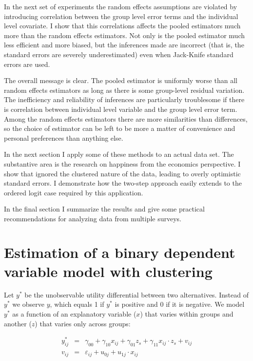 In the next set of experiments the random effects assumptions are violated by introducing correlation between the group level error terms and the individual level covariate. I show that this correlations affects the pooled estimators much more than the random effects estimators. Not only is the pooled estimator much less efficient and more biased, but the inferences made are incorrect (that is, the standard errors are severely underestimated) even when Jack-Knife standard errors are used.

The overall message is clear. The pooled estimator is uniformly worse than all random effects estimators as long as there is some group-level residual variation. The inefficiency and reliability of inferences are particularly troublesome if there is correlation between individual level variable and the group level error term.  Among the random effects estimators there are more similarities than differences, so the choice of estimator can be left to be more a matter of convenience and personal preferences than anything else.

In the next section I apply some of these methods to an actual data set. The substantive area is the research on happiness from the economics perspective.  I show that  \citet{Blanchflower:2004} ignored the clustered nature of the data, leading to overly optimistic standard errors. I  demonstrate how the two-step approach easily extends to the ordered logit case required by this application.

In the final section I summarize the results and give some practical recommendations for analyzing  data from multiple surveys.

\section{Estimation of a binary dependent variable model with clustering}

Let $y^*$ be the unobservable utility differential between two alternatives.  Instead of $y^*$ we  observe $y$, which equals 1 if $y^*$ is positive and 0 if it is negative. We model $y^*$ as a function of an explanatory variable ($x$) that varies within groups and another ($z$) that varies only across groups:

 \begin{eqnarray}
  y^*_{ij}&=&\gamma_{00}+\gamma_{10} x_{ij}+\gamma_{01} z_s+\gamma_{11} x_{ij}
\cdot z_s+v_{ij}\\
v_{ij}&=&\varepsilon_{ij}+u_{0j}+u_{1j}\cdot x_{ij}
\label{eq:logit}
\end{eqnarray}


